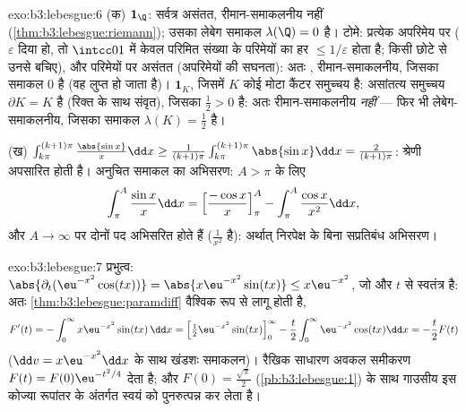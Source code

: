 \begin{solution}{exo:b3:lebesgue:6}
(क) $\mathbf 1_\Q$: सर्वत्र असंतत, रीमान-समाकलनीय नहीं (\cref{thm:b3:lebesgue:riemann}); उसका लेबेग
समाकल $\lambda(\Q) = 0$ है। टोमे: प्रत्येक अपरिमेय पर  ($\varepsilon$ दिया हो, तो
$\intcc01$ में केवल परिमित संख्या के परिमेयों का हर $\leq
1/\varepsilon$ होता है; किसी
छोटे  से उनसे बचिए), और परिमेयों पर असंतत (अपरिमेयों की
सघनता): अतः  , रीमान-समाकलनीय, जिसका समाकल $0$ है
(वह  लुप्त हो जाता है)। $\mathbf 1_K$, जिसमें $K$ कोई मोटा कैंटर
समुच्चय है: असांतत्य समुच्चय $\partial K = K$ है (रिक्त  के साथ संवृत),
जिसका  $\frac12 > 0$ है: अतः रीमान-समाकलनीय \emph{नहीं} --- फिर भी
लेबेग-समाकलनीय, जिसका समाकल $\lambda(K) = \frac12$ है।

(ख) $\int_{k\pi}^{(k+1)\pi}\frac{\abs{\sin x}}x\dd x \geq
\frac1{(k+1)\pi}\int_{k\pi}^{(k+1)\pi}\abs{\sin x}\dd x =
\frac{2}{(k+1)\pi}$: श्रेणी अपसारित होती है। अनुचित समाकल का अभिसरण: $A > \pi$ के
लिए
\[
\int_\pi^A\frac{\sin x}x\dd x = \Bigl[\frac{-\cos
x}x\Bigr]_\pi^A - \int_\pi^A\frac{\cos x}{x^2}\dd x,
\]
और $A \to \infty$ पर दोनों पद अभिसरित होते हैं ($\frac1{x^2}$  है): अर्थात्
निरपेक्ष  के बिना सप्रतिबंध अभिसरण।
\end{solution}

\begin{solution}{exo:b3:lebesgue:7}
प्रभुत्व: $\abs{\partial_t(\eu^{-x^2}\cos(tx))} =
\abs{x\eu^{-x^2}\sin(tx)} \leq x\eu^{-x^2}$, जो  और $t$ से स्वतंत्र है: अतः \cref{thm:b3:lebesgue:paramdiff} वैश्विक
रूप से लागू होती है,
\[
F'(t) = -\int_0^\infty x\eu^{-x^2}\sin(tx)\,\dd x
= \Bigl[\tfrac12\eu^{-x^2}\sin(tx)\Bigr]_0^\infty
- \frac t2\int_0^\infty\eu^{-x^2}\cos(tx)\dd x
= -\frac t2F(t)
\]
($\dd v = x\eu^{-x^2}\dd x$ के साथ खंडशः समाकलन)। रैखिक साधारण अवकल समीकरण $F(t) = F(0)\eu^{-t^2/4}$ देता है;
और $F(0) =
\frac{\sqrt\pi}2$ (\cref{pb:b3:lebesgue:1}) के साथ गाउसीय इस कोज्या रूपांतर के अंतर्गत स्वयं
को पुनरुत्पन्न कर लेता है।
\end{solution}

